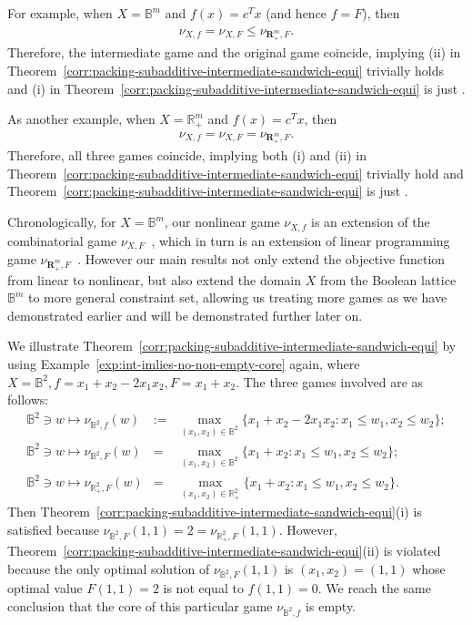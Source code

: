 \documentclass[11pt]{article}\usepackage[]{graphicx}\usepackage[]{xcolor}
\begin{document}
For example, when $X=\mathbb{B}^m$ and $f(x)=c^Tx$ (and hence $f=F$), then 
\begin{eqnarray*}
\nu_{X, f}= \nu_{X, F}\le \nu_{\mathbf{R}^m_{+}, F}.
\end{eqnarray*}
Therefore, the intermediate game and the original game coincide, implying (ii) in Theorem~\ref{corr:packing-subadditive-intermediate-sandwich-equi} trivially holds and (i) in Theorem~\ref{corr:packing-subadditive-intermediate-sandwich-equi} is just \citep[Theorem 1]{deng1999algorithmic}. 

As another example, when $X=\mathbb{R}^m_{+}$ and $f(x)=c^Tx$, then 
\begin{eqnarray*}
\nu_{X, f}= \nu_{X, F}= \nu_{\mathbf{R}^m_{+}, F}.
\end{eqnarray*}
Therefore, all three games coincide, implying both (i) and (ii) in Theorem~\ref{corr:packing-subadditive-intermediate-sandwich-equi} trivially hold and Theorem~\ref{corr:packing-subadditive-intermediate-sandwich-equi} is just \citep[Theorem 4]{samet1984core}. 

Chronologically, for $X=\mathbb{B}^m$, our nonlinear game $\nu_{X, f}$ is an extension of the combinatorial game $\nu_{X, F}$~\citep{deng1999algorithmic}, which in turn is an extension of linear programming game $\nu_{\mathbf{R}^m_{+}, F}$~\citep{samet1984core}. However our main results not only extend the objective function from linear to nonlinear, but also extend the domain $X$ from the Boolean lattice $\mathbb{B}^m$ to more general constraint set, allowing us treating more games as we have demonstrated earlier and will be demonstrated further later on.


We illustrate Theorem~\ref{corr:packing-subadditive-intermediate-sandwich-equi} by using Example~\ref{exp:int-imlies-no-non-empty-core} again, where $X=\mathbb{B}^2, f=x_1+x_2-2x_1x_2, F=x_1+x_2$. The three games involved are as follows: 
\begin{eqnarray*}
\mathbb{B}^2\ni w\mapsto \nu_{\mathbb{B}^2,f}(w)&:=&\max_{(x_1, x_2)\in\mathbb{B}^2}\{x_1+x_2-2x_1x_2: x_1\le w_1, x_2\le w_2\};\\
\mathbb{B}^2\ni w\mapsto \nu_{\mathbb{B}^2,F}(w)&=&\max_{(x_1, x_2)\in\mathbb{B}^2}\{x_1+x_2: x_1\le w_1, x_2\le w_2\};\\
\mathbb{B}^2\ni w\mapsto \nu_{\mathbb{R}^2_{+},F}(w)&=&\max_{(x_1, x_2)\in\mathbb{R}^2_{+}}\{x_1+x_2: x_1\le w_1, x_2\le w_2\}.
\end{eqnarray*}
Then Theorem~\ref{corr:packing-subadditive-intermediate-sandwich-equi}(i) is satisfied because
$\nu_{\mathbb{B}^2, F}(1,1)=2=\nu_{\mathbb{R}^2_{+}, F}(1,1)$. However, Theorem~\ref{corr:packing-subadditive-intermediate-sandwich-equi}(ii) is violated because the only optimal solution of $\nu_{\mathbb{B}^2,F}(1,1)$ is $(x_1,x_2)=(1,1)$ whose optimal value $F(1,1)=2$ is not equal to $f(1,1)=0$. We reach the same conclusion that the core of this particular game $\nu_{\mathbb{B}^2,f}$ is empty.  
\end{document}
